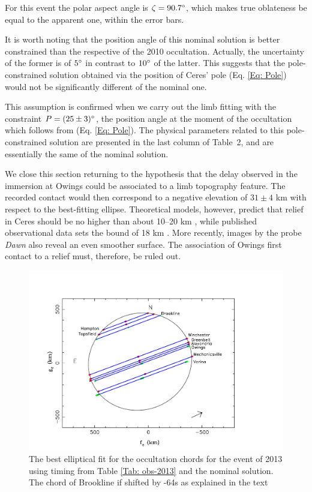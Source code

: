 \documentclass[useAMS,usenatbib]{mn2e}
\begin{document}
For this event the polar aspect angle is $\zeta = 90.7\hbox{$^\circ$}$, which makes true oblateness be equal to the apparent one, within the error bars.

It is worth noting that the position angle of this nominal solution is better constrained than the respective of the 2010 occultation. Actually, the uncertainty of the former is of $5\hbox{$^\circ$}$ in contrast to $10\hbox{$^\circ$}$ of the latter. This suggests that the pole-constrained solution obtained via the position of Ceres' pole (Eq. \ref{Eq: Pole}) would not be significantly different of the nominal one.

This assumption is confirmed when we carry out the limb fitting with the constraint $P = (25 \pm 3)\hbox{$^\circ$}$, the position angle at the moment of the occultation which follows from (Eq. \ref{Eq: Pole}). The physical parameters related to this pole-constrained solution are presented in the last column of Table~2, and are essentially the same of the nominal solution.

We close this section returning to the hypothesis that the delay observed in the immersion at Owings could be associated to a limb topography feature. The recorded contact would then correspond to a negative elevation of $31 \pm 4$ km with respect to the best-fitting ellipse. Theoretical models, however, predict that relief in Ceres should be no higher than about 10--20 km \citep{Johnson1973}, while published observational data sets the bound of 18 km \citep{Carry2008}. More recently, images by the probe \textit{Dawn} also reveal an even smoother surface. The association of Owings first contact to a relief must, therefore, be ruled out.

\begin{figure}
\includegraphics[scale=0.36]{figures/Ceres_2013_body.pdf}
\caption{The best elliptical fit for the occultation chords for the event of 2013 using timing from Table \ref{Tab: obs-2013} and the nominal solution. The chord of Brookline if shifted by -64s as explained in the text\label{Fig: Ceres-2013-body}}
\end{figure}
\end{document}
